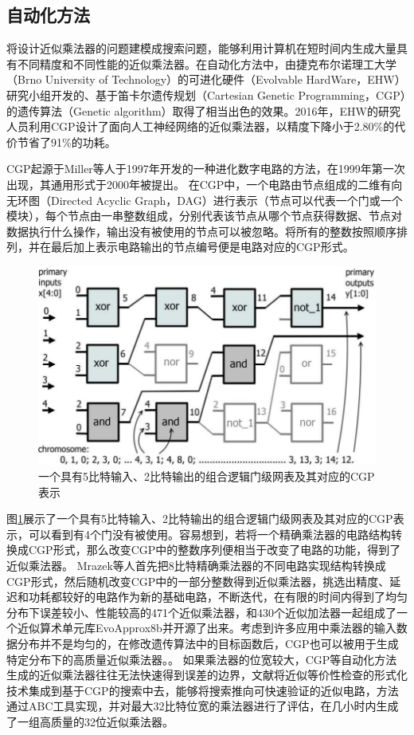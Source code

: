 \subsection{自动化方法}

将设计近似乘法器的问题建模成搜索问题，能够利用计算机在短时间内生成大量具有不同精度和不同性能的近似乘法器。在自动化方法中，由捷克布尔诺理工大学（Brno University of Technology）的可进化硬件（Evolvable HardWare，EHW）研究小组开发的、基于笛卡尔遗传规划（Cartesian Genetic Programming，CGP）\cite{CGP_2008,CGP_2011}的遗传算法（Genetic algorithm）取得了相当出色的效果。2016年，EHW的研究人员利用CGP设计了面向人工神经网络的近似乘法器\cite{AC:AM:CGP_2016}，以精度下降小于2.80\%的代价节省了91\%的功耗。

CGP起源于Miller等人于1997年开发的一种进化数字电路的方法\cite{CGP_1997}，在1999年第一次出现\cite{CGP_1999}，其通用形式于2000年被提出\cite{CGP_2000}。
在CGP中，一个电路由节点组成的二维有向无环图（Directed Acyclic Graph，DAG）进行表示（节点可以代表一个门或一个模块），每个节点由一串整数组成，分别代表该节点从哪个节点获得数据、节点对数据执行什么操作，输出没有被使用的节点可以被忽略。将所有的整数按照顺序排列，并在最后加上表示电路输出的节点编号便是电路对应的CGP形式。
\begin{figure}[!htb]
    \centering
    \includegraphics[width=0.8\linewidth]{figs/AC-AM-CGP.png}
    \caption{一个具有5比特输入、2比特输出的组合逻辑门级网表及其对应的CGP表示}
\label{AC:AM:CGP}
\end{figure}
图\ref{AC:AM:CGP}展示了一个具有5比特输入、2比特输出的组合逻辑门级网表及其对应的CGP表示，可以看到有4个门没有被使用。容易想到，若将一个精确乘法器的电路结构转换成CGP形式，那么改变CGP中的整数序列便相当于改变了电路的功能，得到了近似乘法器。
Mrazek等人首先把8比特精确乘法器的不同电路实现结构转换成CGP形式，然后随机改变CGP中的一部分整数得到近似乘法器，挑选出精度、延迟和功耗都较好的电路作为新的基础电路，不断迭代，在有限的时间内得到了均匀分布下误差较小、性能较高的471个近似乘法器，和430个近似加法器一起组成了一个近似算术单元库EvoApprox8b\cite{AC:AM:CGP_Evoapprox8b}并开源了出来。考虑到许多应用中乘法器的输入数据分布并不是均匀的，在修改遗传算法中的目标函数后，CGP也可以被用于生成特定分布下的高质量近似乘法器。\cite{AC:AM:CGP_2019}。
如果乘法器的位宽较大，CGP等自动化方法生成的近似乘法器往往无法快速得到误差的边界，文献\cite{AC:AM:CGP_32bit}将近似等价性检查的形式化技术集成到基于CGP的搜索中去，能够将搜索推向可快速验证的近似电路，方法通过ABC\cite{LS:ABC}工具实现，并对最大32比特位宽的乘法器进行了评估，在几小时内生成了一组高质量的32位近似乘法器。

